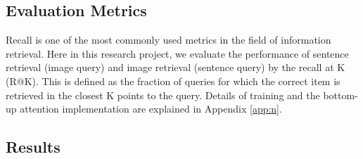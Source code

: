 \subsection{Evaluation Metrics}

Recall is one of the most commonly used metrics in the field of information retrieval. Here in this research project, we evaluate the performance of sentence retrieval (image query) and image retrieval (sentence query) by the recall at K (R@K). This is defined as the fraction of queries for which the correct item is retrieved in the closest K points to the query. Details of training and the bottom-up attention implementation are explained in Appendix \ref{app:n}.

\subsection{Results}


